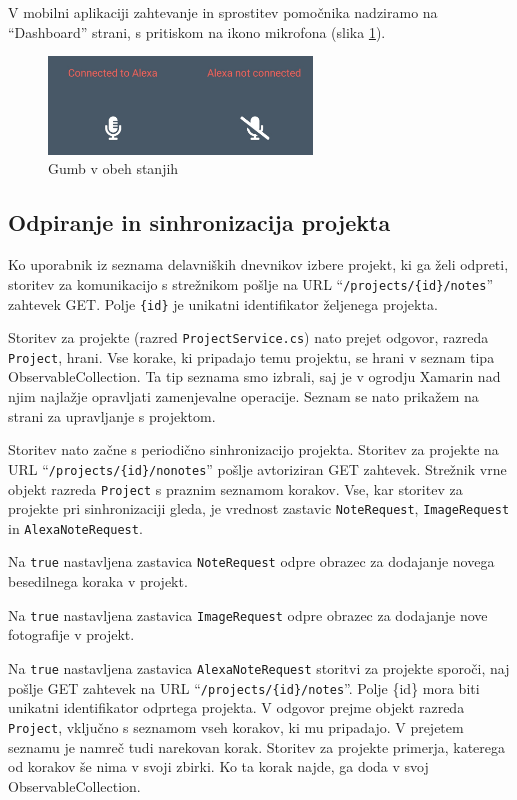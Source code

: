 \documentclass[a4paper, 12pt]{book}
\begin{document}
V mobilni aplikaciji zahtevanje in sprostitev pomočnika nadziramo na \enquote{Dashboard} strani, s pritiskom na ikono mikrofona (slika \ref{app_alexa_yesno}).

\begin{figure}[H]
\begin{center}
\includegraphics[width=7cm]{app_alexa_yesno}
\end{center}
	\caption{Gumb v obeh stanjih}
\label{app_alexa_yesno}
\end{figure}

\subsection{Odpiranje in sinhronizacija projekta}

Ko uporabnik iz seznama delavniških dnevnikov izbere projekt, ki ga želi odpreti, storitev za komunikacijo s strežnikom pošlje na URL \enquote{\texttt{/projects/\{id\}/notes}} zahtevek GET.
Polje \texttt{\{id\}} je unikatni identifikator željenega projekta.

Storitev za projekte (razred \texttt{ProjectService.cs}) nato prejet odgovor, razreda \texttt{Project}, hrani.
Vse korake, ki pripadajo temu projektu, se hrani v seznam tipa ObservableCollection.
Ta tip seznama smo izbrali, saj je v ogrodju Xamarin nad njim najlažje opravljati zamenjevalne operacije.
Seznam se nato prikažem na strani za upravljanje s projektom.

Storitev nato začne s periodično sinhronizacijo projekta.
Storitev za projekte na URL \enquote{\texttt{/projects/\{id\}/nonotes}} pošlje avtoriziran GET zahtevek.
Strežnik vrne objekt razreda \texttt{Project} s praznim seznamom korakov.
Vse, kar storitev za projekte pri sinhronizaciji gleda, je vrednost zastavic \texttt{NoteRequest}, \texttt{ImageRequest} in \texttt{AlexaNoteRequest}.

Na \texttt{true} nastavljena zastavica \texttt{NoteRequest} odpre obrazec za dodajanje novega besedilnega koraka v projekt.

Na \texttt{true} nastavljena zastavica \texttt{ImageRequest} odpre obrazec za dodajanje nove fotografije v projekt.

Na \texttt{true} nastavljena zastavica \texttt{AlexaNoteRequest} storitvi za projekte sporoči, naj pošlje GET zahtevek na URL \enquote{\texttt{/projects/\{id\}/notes}}.
Polje \{id\} mora biti unikatni identifikator odprtega projekta.
V odgovor prejme objekt razreda \texttt{Project}, vključno s seznamom vseh korakov, ki mu pripadajo.
V prejetem seznamu je namreč tudi narekovan korak.
Storitev za projekte primerja, katerega od korakov še nima v svoji zbirki.
Ko ta korak najde, ga doda v svoj ObservableCollection.
\end{document}
